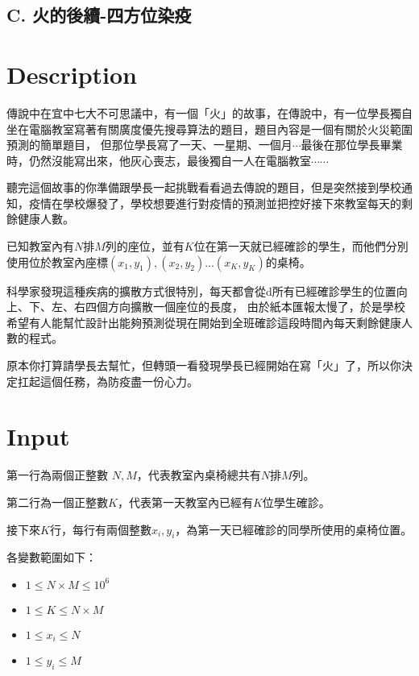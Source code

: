 \documentclass[11pt,a4paper]{article}
\begin{document}
\begin{center}
\section*{C. 火的後續-四方位染疫}
\end{center}

\section*{Description}

傳說中在宜中七大不可思議中，有一個「火」的故事，在傳說中，有一位學長獨自坐在電腦教室寫著有關廣度優先搜尋算法的題目，題目內容是一個有關於火災範圍預測的簡單題目，
但那位學長寫了一天、一星期、一個月$\cdots$最後在那位學長畢業時，仍然沒能寫出來，他灰心喪志，最後獨自一人在電腦教室$\cdots\cdots$

聽完這個故事的你準備跟學長一起挑戰看看過去傳說的題目，但是突然接到學校通知，疫情在學校爆發了，學校想要進行對疫情的預測並把控好接下來教室每天的剩餘健康人數。

已知教室內有$N$排$M$列的座位，並有$K$位在第一天就已經確診的學生，而他們分別使用位於教室內座標$(x_1, y_1), (x_2, y_2)... (x_K, y_K)$的桌椅。

科學家發現這種疾病的擴散方式很特別，每天都會從d所有已經確診學生的位置向上、下、左、右四個方向擴散一個座位的長度，
由於紙本匯報太慢了，於是學校希望有人能幫忙設計出能夠預測從現在開始到全班確診這段時間內每天剩餘健康人數的程式。 

原本你打算請學長去幫忙，但轉頭一看發現學長已經開始在寫「火」了，所以你決定扛起這個任務，為防疫盡一份心力。

	
\section*{Input}

第一行為兩個正整數 $N, M$，代表教室內桌椅總共有$N$排$M$列。

第二行為一個正整數$K$，代表第一天教室內已經有$K$位學生確診。 

接下來$K$行，每行有兩個整數$x_i,y_i$，為第一天已經確診的同學所使用的桌椅位置。

各變數範圍如下：
\begin{itemize}
    \item $1 \le N \times M \le 10^6$
    \item $1 \le K \le N \times M$
    \item $1 \le x_i \leq N$
    \item $1 \le y_i \leq M$
\end{itemize}\
\end{document}
